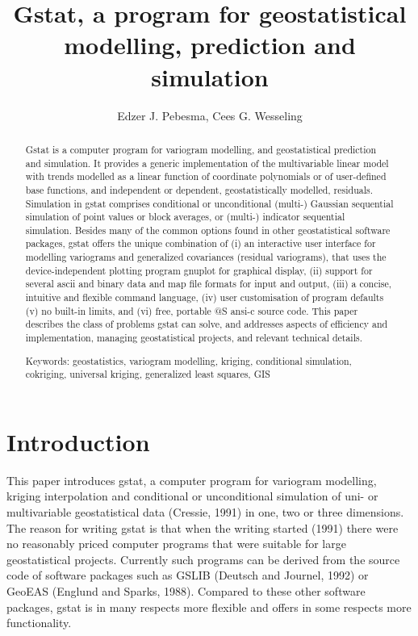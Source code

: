 \documentclass{article}
\title{Gstat, a program for geostatistical modelling, 
prediction and simulation }
\author{ Edzer J. Pebesma, Cees G. Wesseling }
\affiliation{ Netherlands Centre for Geo-ecological Research (ICG) }
\begin{document}
\maketitle

\begin{abstract}
Gstat is a computer program for variogram modelling, and geostatistical
prediction and simulation. It provides a generic implementation of the
multivariable linear model with trends modelled as a linear function of
coordinate polynomials or of user-defined base functions, and
independent or dependent, geostatistically modelled, residuals.
Simulation in gstat comprises conditional or unconditional (multi-)
Gaussian sequential simulation of point values or block averages, or
(multi-) indicator sequential simulation.  Besides many of the common
options found in other geostatistical software packages, gstat offers
the unique combination of (i) an interactive user interface for
modelling variograms and generalized covariances (residual variograms),
that uses the device-independent plotting program gnuplot for graphical
display, (ii) support for several ascii and binary data and map file
formats for input and output, (iii) a concise, intuitive and flexible
command language, (iv) user customisation of program defaults (v) no
built-in limits, and (vi) free, portable @S ansi-c source code. This
paper describes the class of problems gstat can solve, and addresses
aspects of efficiency and implementation, managing geostatistical
projects, and relevant technical details.

{\sc Keywords}: geostatistics, variogram modelling, kriging, conditional
simulation, cokriging, universal kriging, generalized least squares, GIS
\end{abstract}

\section{Introduction}

This paper introduces gstat, a computer program for variogram modelling,
kriging interpolation and conditional or unconditional simulation of
uni- or multivariable geostatistical data (Cressie, 1991) in one, two or
three dimensions. The reason for writing gstat is that when the writing
started (1991) there were no reasonably priced computer programs that
were suitable for large geostatistical projects. Currently such programs
can be derived from the source code of software packages such as GSLIB
(Deutsch and Journel, 1992) or GeoEAS (Englund and Sparks, 1988). Compared
to these other software packages, gstat is in many respects more flexible
and offers in some respects more functionality.
\end{document}
